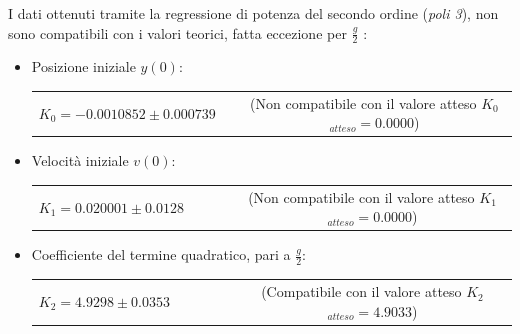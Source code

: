 \documentclass[12pt, a4paper]{article}
\begin{document}
I dati ottenuti tramite la regressione di potenza del secondo ordine (\textit{poli 3}), non sono compatibili con i valori teorici, fatta eccezione per $\displaystyle{\frac{g}{2}}$ :


\renewcommand{\theenumii}{\roman{enumii}}  
\begin{itemize}
    \itemsep0em 
    
        \item Posizione iniziale $y(0)$:
        
        \begin{tabular}{ccc}
        {$K_0 = -0.0010852 \pm 0.000739$} & & \small{(Non compatibile con il valore atteso $K_{0}$ $_{atteso}= 0.0000$)}\\
        \end{tabular}
        
    \end{itemize}
    \begin{itemize}
        \item Velocità iniziale $v(0)$:\\
        \begin{tabular}{ccccc}
        {$K_1 =  0.020001 \pm 0.0128$} & & & & \small{(Non compatibile con il valore atteso $K_{1}$ $_{atteso} = 0.0000$)}\\
        \end{tabular}
        
    \end{itemize}
      \begin{itemize}
          \item Coefficiente del termine quadratico, pari a $\displaystyle{\frac{g}{2}}$:\\ 
          \begin{tabular}{cccccc}
              {$K_2 =  4.9298 \pm 0.0353$} & & & & &\small{(Compatibile con il valore atteso $K_{2}$ $_{atteso}= 4.9033$)}\\
          \end{tabular}
         
      \end{itemize}
        
        
\newpage
\end{document}
